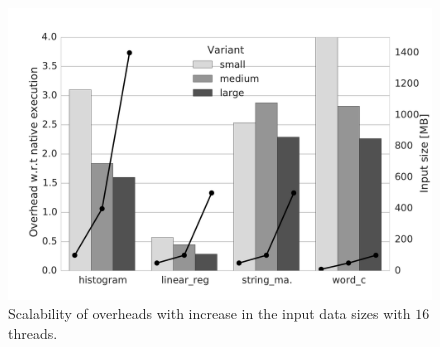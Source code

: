 
\begin{figure}[t]
\centering
\includegraphics[scale=0.25]{figure/benchmarks/worksize-times-XY_with_Intel_PT.pdf}
\caption{Scalability of overheads with increase in the input data sizes with $16$ threads. }
\label{fig:data-size-overheads}
\end{figure}
